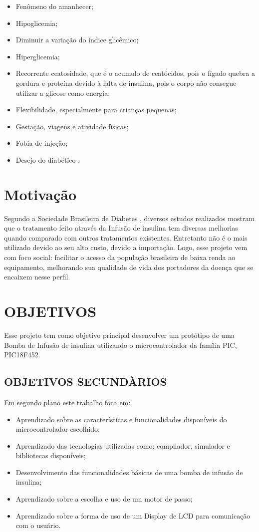 \begin{itemize}
\item Fenômeno do amanhecer;
\item Hipoglicemia;
\item Diminuir a variação do índice glicêmico;
\item Hiperglicemia;
\item Recorrente ceatosidade, que é o acumulo de ceatócidos, pois o fígado quebra a gordura e proteína devido à falta de insulina, pois o corpo não consegue utilizar a glicose como energia;
\item Flexibilidade, especialmente para crianças pequenas;
\item Gestação, viagens e atividade físicas;
\item Fobia de injeção;
\item Desejo do diabético \cite{diabetes2013, portaldiabetes2009}.
\end{itemize}

\section{Motivação}
Segundo a Sociedade Brasileira de Diabetes \cite{sbc2014}, diversos estudos realizados mostram que o tratamento feito através da Infusão de insulina tem diversas melhorias quando comparado com outros tratamentos existentes. Entretanto não é o mais utilizado devido ao seu alto custo, devido a importação.
Logo, esse projeto vem com foco social: facilitar o acesso da população brasileira de baixa renda ao equipamento, melhorando sua qualidade de vida dos portadores da doença que se encaixem nesse perfil. 

\section{OBJETIVOS}
Esse projeto tem como objetivo principal desenvolver um protótipo de uma Bomba de Infusão de insulina utilizando o microcontrolador da família PIC, PIC18F452. 

\subsection{OBJETIVOS SECUNDÀRIOS}

Em segundo plano este trabalho foca em:
\begin{itemize}
\item Aprendizado sobre as características e funcionalidades disponíveis do microcontrolador escolhido;
\item Aprendizado das tecnologias utilizadas como: compilador, simulador e bibliotecas disponíveis;
\item Desenvolvimento das funcionalidades básicas de uma bomba de infusão de insulina;
\item Aprendizado sobre a escolha e uso de um motor de passo;
\item Aprendizado sobre a forma de uso de um Display de LCD para comunicação com o usuário.
\end{itemize}

